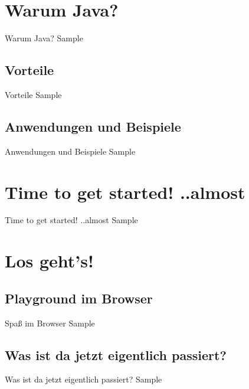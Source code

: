 
\section{Warum Java?}
\begin{frame}{Warum Java?}
	Sample
\end{frame}


\subsection{Vorteile}
\begin{frame}{Vorteile}
	Sample
\end{frame}


\subsection{Anwendungen und Beispiele}
\begin{frame}{Anwendungen und Beispiele}
	Sample
\end{frame}



\section{Time to get started! ..almost}

\begin{frame}{Time to get started! ..almost}
	Sample
\end{frame}




\section{Los geht's!}


\subsection{Playground im Browser}
\begin{frame}{Spaß im Browser}
	Sample
\end{frame}


\subsection{Was ist da jetzt eigentlich passiert?}
\begin{frame}{Was ist da jetzt eigentlich passiert?}
	Sample
\end{frame}


